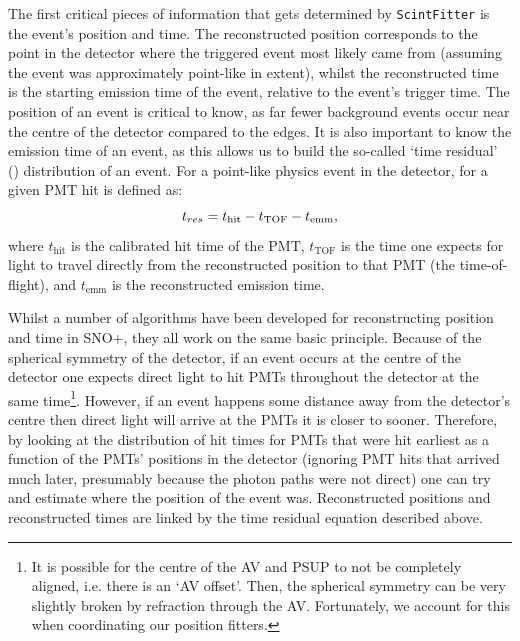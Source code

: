 The first critical pieces of information that gets determined by \texttt{ScintFitter} is the event's position and time. The reconstructed position corresponds to the point in the detector where the triggered event most likely came from (assuming the event was approximately point-like in extent), whilst the reconstructed time is the starting emission time of the event, relative to the event's trigger time. The position of an event is critical to know, as far fewer background events occur near the centre of the detector compared to the edges. It is also important to know the emission time of an event, as this allows us to build the so-called `time residual' (\tres{}) distribution of an event. For a point-like physics event in the detector, \tres{} for a given PMT hit is defined as:
\begin{equation}
    t_{res} = t_{\mathrm{hit}} - t_{\mathrm{TOF}} - t_{\mathrm{emm}},
\end{equation}
where $t_{\mathrm{hit}}$ is the calibrated hit time of the PMT, $t_{\mathrm{TOF}}$ is the time one expects for light to travel directly from the reconstructed position to that PMT (the time-of-flight), and $t_{\mathrm{emm}}$ is the reconstructed emission time.

Whilst a number of algorithms have been developed for reconstructing position and time in SNO+, they all work on the same basic principle. Because of the spherical symmetry of the detector, if an event occurs at the centre of the detector one expects direct light to hit PMTs throughout the detector at the same time\footnote{It is possible for the centre of the AV and PSUP to not be completely aligned, i.e. there is an `AV offset'. Then, the spherical symmetry can be very slightly broken by refraction through the AV. Fortunately, we account for this when coordinating our position fitters.}.
However, if an event happens some distance away from the detector's centre then direct light will arrive at the PMTs it is closer to sooner. Therefore, by looking at the distribution of hit times for PMTs that were hit earliest as a function of the PMTs' positions in the detector (ignoring PMT hits that arrived much later, presumably because the photon paths were not direct) one can try and estimate where the position of the event was. Reconstructed positions and reconstructed times are linked by the time residual equation described above.

